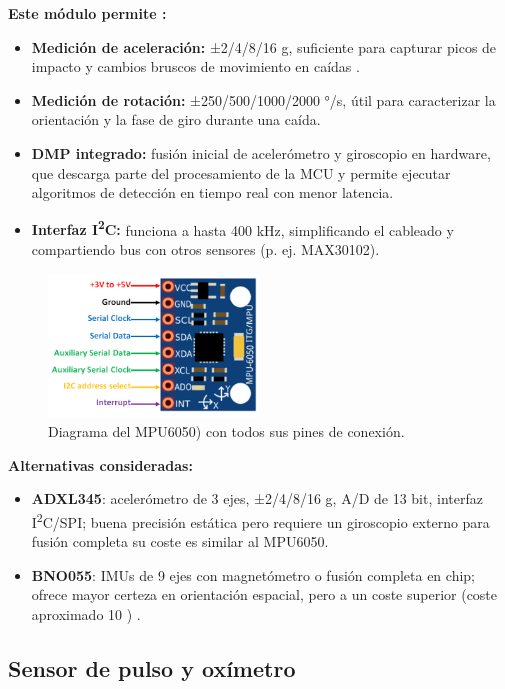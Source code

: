 \documentclass[12pt, a4paper]{article}
\begin{document}
	\noindent\textbf{Este módulo permite \cite{MPU6050Datasheet}:}
	\begin{itemize}
		\item \textbf{Medición de aceleración:} ±2/4/8/16 g, suficiente para capturar picos de impacto y cambios bruscos de movimiento en caídas .
		\item \textbf{Medición de rotación:} ±250/500/1000/2000 °/s, útil para caracterizar la orientación y la fase de giro durante una caída.
		\item \textbf{DMP integrado:} fusión inicial de acelerómetro y giroscopio en hardware, que descarga parte del procesamiento de la MCU y permite ejecutar algoritmos de detección en tiempo real con menor latencia.
		\item \textbf{Interfaz I\textsuperscript{2}C:} funciona a hasta 400 kHz, simplificando el cableado y compartiendo bus con otros sensores (p. ej. MAX30102).
	\end{itemize}
	
	\begin{figure}[htbp]
		\centering
		\includegraphics[width=0.5\textwidth]{images/MPU6050.png}
		\caption[Diagrama de pines del MPU6050]{Diagrama del  \mbox{MPU6050)} con todos sus pines de conexión.}
		\label{fig:mpu}
	\end{figure}
	
	\noindent\textbf{Alternativas consideradas:}
	\begin{itemize}
		\item \textbf{ADXL345}: acelerómetro de 3 ejes, ±2/4/8/16 g, A/D de 13 bit, interfaz I\textsuperscript{2}C/SPI; buena precisión estática pero requiere un giroscopio externo para fusión completa su coste es similar al MPU6050\cite{ADXL345Datasheet}.
		\item \textbf{BNO055}: IMUs de 9 ejes con magnetómetro o fusión completa en chip; ofrece mayor certeza en orientación espacial, pero a un coste superior (coste aproximado 10 \texteuro{}) \cite{BNO055Datasheet}.
	\end{itemize}

	\subsection{Sensor de pulso y oxímetro}
	
\end{document}
